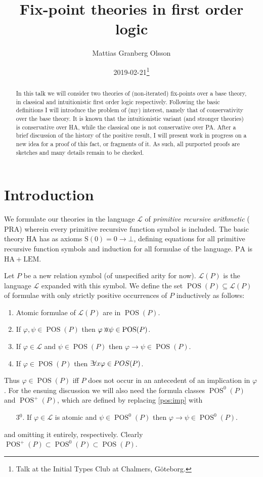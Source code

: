 \documentclass{scrartcl}
\title{Fix-point theories in first order logic}
\author{Mattias Granberg Olsson}
\date{2019-02-21\footnote{Talk at the Initial Types Club at Chalmers, Göteborg.}}
\theoremstyle{definition}
\theoremstyle{plain}
\theoremstyle{remark}
\newcommand{\falsum}{\bot}
\newcommand{\limp}{\rightarrow}
\newcommand{\landor}{\land\mspace{-16mu}\lor}
\newcommand{\forallexists}{\exists\mspace{-4mu}\forall}
\renewcommand{\=}{=\!\!\!=}
\newcommand{\PA}{\ensuremath{\mathrm{PA}}}
\renewcommand{\L}{\ensuremath{\mathcal{L}}}
\renewcommand{\S}{\ensuremath{\mathrm{S}}}
\DeclareMathOperator{\POS}{POS}
\newcommand{\HA}{\ensuremath{\mathrm{HA}}}
\newcommand{\PRA}{\ensuremath{\mathrm{PRA}}}
\begin{document}
\maketitle

\begin{abstract}
  In this talk we will consider two theories of (non-iterated) fix-points over a base theory, in classical and intuitionistic first order logic respectively. Following the basic definitions I will introduce the problem of (my) interest, namely that of conservativity over the base theory. It is known that the intuitionistic variant (and stronger theories) is conservative over HA, while the classical one is not conservative over PA. After a brief discussion of the history of the positive result, I will present work in progress on a new idea for a proof of this fact, or fragments of it. As such, all purported proofs are sketches and many details remain to be checked.
\end{abstract}

\section{Introduction}
\label{sec:intro}

We formulate our theories in the language $\L$ of \emph{primitive recursive arithmetic} ($\PRA$) wherein every primitive recursive function symbol is included. The basic theory $\HA$ has as axioms $\S(0) = 0 \limp \falsum$, defining equations for all primitive recursive function symbols and induction for all formulae of the language. $\PA$ is $\HA + \mathrm{LEM}$.

Let $P$ be a new relation symbol (of unspecified arity for now). $\L(P)$ is the language $\L$ expanded with this symbol. We define the set $\POS(P) \subseteq \L(P)$ of formulae with only strictly positive occurrences of $P$ inductively as follows:
\begin{enumerate}
\item Atomic formulae of $\L(P)$ are in $\POS(P)$.
\item If $\varphi, \psi \in \POS(P)$ then $\varphi \landor \psi \in \POS(P)$.
\item If $\varphi \in \L$ and $\psi \in \POS(P)$ then $\varphi \limp \psi \in \POS(P)$.\label{pos:imp}
\item If $\varphi \in \POS(P)$ then $\forallexists x \varphi \in POS(P)$.
\end{enumerate}
Thus $\varphi \in \POS(P)$ iff $P$ does not occur in an antecedent of an implication in $\varphi$. For the ensuing discussion we will also need the formula classes $\POS^0(P)$ and $\POS^+(P)$, which are defined by replacing \ref{pos:imp} with
\begin{enumerate}
\item[3${}^0$.] If $\varphi \in \L$ is atomic and $\psi \in \POS^0(P)$ then $\varphi \limp \psi \in \POS^0(P)$.
\end{enumerate}
and omitting it entirely, respectively. Clearly $\POS^+(P) \subset \POS^0(P) \subset \POS(P)$.
\end{document}
